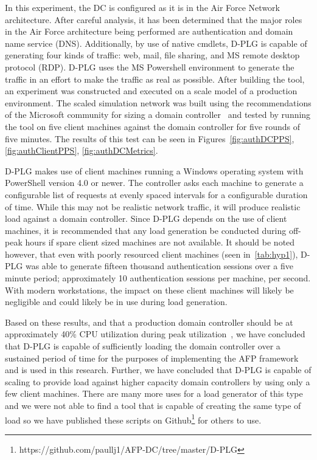 In this experiment, the DC is configured as it is in the Air Force Network
architecture.  After careful analysis, it has been determined that the major
roles in the Air Force architecture being performed are authentication and
domain name service (DNS).  Additionally, by use of native cmdlets, D-PLG is
capable of generating four kinds of traffic: web, mail, file sharing, and MS
remote desktop protocol (RDP).  D-PLG uses the MS Powershell environment to
generate the traffic in an effort to make the traffic as real as possible.
After building the tool, an experiment was constructed and executed on a scale
model of a production environment.  The scaled simulation network was built
using the recommendations of the Microsoft community for sizing a domain
controller~\cite{mak12} and tested by running the tool on five client machines
against the domain controller for five rounds of five minutes.  The results of
this test can be seen in Figures~\ref{fig:authDCPPS}, \ref{fig:authClientPPS},
\ref{fig:authDCMetrics}.

\figAuthDCPPS{4in}
\figAuthClientPPS{4in}
\figAuthDCMetrics{4in}

D-PLG makes use of client machines running a Windows operating system with
PowerShell version 4.0 or newer.  The controller asks each machine to generate
a configurable list of requests at evenly spaced intervals for a configurable
duration of time.  While this may not be realistic network traffic, it will
produce realistic load against a domain controller.  Since D-PLG depends on the
use of client machines, it is recommended that any load generation be conducted
during off-peak hours if spare client sized machines are not available.  It
should be noted however, that even with poorly resourced client machines (seen
in~\ref{tab:hyp1}), D-PLG was able to generate fifteen thousand authentication
sessions over a five minute period; approximately 10 authentication sessions
per machine, per second.  With modern workstations, the impact on these client
machines will likely be negligible and could likely be in use during load
generation.

Based on these results, and that a production domain controller should be at
approximately 40\% CPU utilization during peak utilization~\cite{mak12}, we
have concluded that D-PLG is capable of sufficiently loading the domain
controller over a sustained period of time for the purposes of implementing the
AFP framework and is used in this research.  Further, we have concluded that
D-PLG is capable of scaling to provide load against higher capacity domain
controllers by using only a few client machines.  There are many more uses for
a load generator of this type and we were not able to find a tool that is
capable of creating the same type of load so we have published these scripts on
Github\footnote{https://github.com/paullj1/AFP-DC/tree/master/D-PLG} for others
to use.

